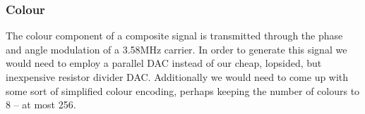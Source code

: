 \subsubsection*{Colour}

The colour component of a composite signal is transmitted through the phase and
angle modulation of a 3.58MHz carrier. In order to generate this signal we would
need to employ a parallel DAC instead of our cheap, lopsided, but inexpensive
resistor divider DAC. Additionally we would need to come up with some sort of
simplified colour encoding, perhaps keeping the number of colours to 8 -- at
most 256.
